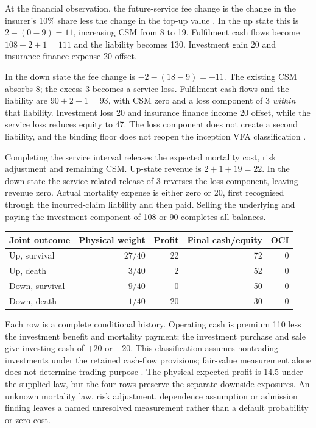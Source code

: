 At the financial observation, the future-service fee change is the change
in the insurer's 10\% share less the change in the top-up value
\citep[paragraph 45 and B111--B114]{aasb17}. In the up state this is
$2-(0-9)=11$, increasing CSM from 8 to 19. Fulfilment cash flows become
$108+2+1=111$ and the liability becomes 130. Investment gain 20 and
insurance finance expense 20 offset.

In the down state the fee change is $-2-(18-9)=-11$. The existing CSM
absorbs 8; the excess 3 becomes a service loss. Fulfilment cash flows and the
liability are $90+2+1=93$, with CSM zero and a loss component of 3
\emph{within} that liability. Investment loss 20 and insurance finance income
20 offset, while the service loss reduces equity to 47. The loss component
does not create a second liability, and the binding floor does not reopen
the inception VFA classification
\citep[paragraphs 45, 48--52, 87(c) and B102]{aasb17}.

Completing the service interval releases the expected mortality cost, risk
adjustment and remaining CSM. Up-state revenue is $2+1+19=22$.
In the down state the service-related release of 3 reverses the loss component,
leaving revenue zero. Actual mortality expense is either zero or 20, first
recognised through the incurred-claim liability and then paid. Selling the
underlying and paying the investment component of 108 or 90 completes all
balances.

\begin{center}
\begin{tabular}{@{}lrrrr@{}}
\toprule
Joint outcome & Physical weight & Profit & Final cash/equity & OCI\\
\midrule
Up, survival   & $27/40$ & 22  & 72 & 0\\
Up, death      & $3/40$  & 2   & 52 & 0\\
Down, survival & $9/40$  & 0   & 50 & 0\\
Down, death    & $1/40$  & $-20$ & 30 & 0\\
\bottomrule
\end{tabular}
\end{center}

Each row is a complete conditional history. Operating cash is premium 110
less the investment benefit and mortality payment; the investment purchase
and sale give investing cash of $+20$ or $-20$. This classification assumes
nontrading investments under the retained cash-flow provisions; fair-value
measurement alone does not determine trading purpose
\citep[paragraphs 14--16]{aasb107dated}. The physical expected profit is 14.5
under the supplied law, but the four rows preserve the separate downside
exposures. An unknown mortality law, risk adjustment, dependence assumption
or admission finding leaves a named unresolved measurement rather than a
default probability or zero cost.

